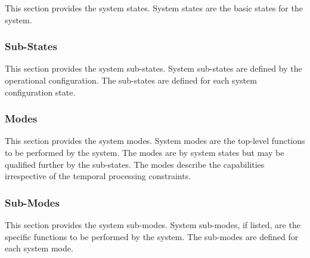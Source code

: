 This section provides the system states.
System states are the basic states for the system.




\subsubsection{Sub-States}
\label{loc:Heavy_substates}

This section provides the system sub-states.
System sub-states are defined by the operational configuration.
The sub-states are defined for each system configuration state.




\subsubsection{Modes}
\label{loc:Heavy_modes}

This section provides the system modes.
System modes are the top-level functions to be performed by the system.
The modes are by system states but may be qualified further by the sub-states.
The modes describe the capabilities irrespective of the temporal processing constraints.




\subsubsection{Sub-Modes}
\label{loc:Heavy_submodes}

This section provides the system sub-modes.
System sub-modes, if listed, are the specific functions to be performed by the system.
The sub-modes are defined for each system mode.


